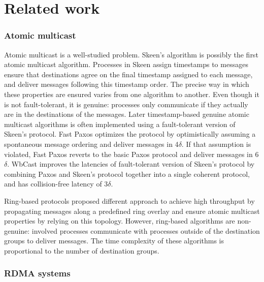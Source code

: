 \section{Related work}
\label{sec:related-work}

\subsubsection*{Atomic multicast}
Atomic multicast is a well-studied problem. Skeen’s algorithm
\cite{birman1987reliable} is possibly the first atomic multicast algorithm.
Processes in Skeen assign timestamps to messages ensure that destinations agree
on the final timestamp assigned to each message, and deliver messages following
this timestamp order. The precise way in which these properties are ensured
varies from one algorithm to another. Even though it is not fault-tolerant, it
is genuine: processes only communicate if they actually are in the destinations
of the messages. Later timestamp-based genuine atomic multicast algorithms is
often implemented using a fault-tolerant version of Skeen’s protocol. Fast Paxos
\cite{coelho2017fast} optimizes the protocol by optimistically assuming a
spontaneous message ordering and deliver messages in 4$\delta$. If that
assumption is violated, Fast Paxos reverts to the basic Paxos protocol and
deliver messages in 6$\delta$. WbCast \cite{gotsman2019white} improves the
latencies of fault-tolerant version of Skeen’s protocol by combining Paxos and
Skeen’s protocol together into a single coherent protocol, and has
collision-free latency of 3$\delta$.

Ring-based protocols \cite{delporte2000fault, bezerra2015ridge,
marandi2012multi} proposed different approach to achieve high throughput by
propagating messages along a predefined ring overlay and ensure atomic multicast
properties by relying on this topology. However, ring-based algorithms are
non-genuine: involved processes communicate with processes outside of the
destination groups to deliver messages. The time complexity of these algorithms is
proportional to the number of destination groups.

\subsubsection*{RDMA systems}

